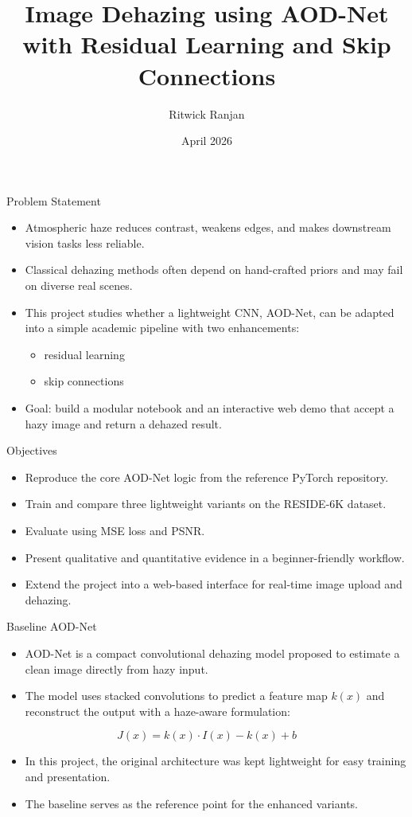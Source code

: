 \documentclass[aspectratio=169]{beamer}
\title[Image Dehazing with AOD-Net]{Image Dehazing using AOD-Net\\with Residual Learning and Skip Connections}
\author{Ritwick Ranjan}
\institute{Department of Computer Science \\ Your Institute Name}
\date{April 2026}
\begin{document}
\begin{frame}
  \titlepage
\end{frame}

\begin{frame}{Problem Statement}
  \begin{itemize}
    \item Atmospheric haze reduces contrast, weakens edges, and makes downstream vision tasks less reliable.
    \item Classical dehazing methods often depend on hand-crafted priors and may fail on diverse real scenes.
    \item This project studies whether a lightweight CNN, AOD-Net, can be adapted into a simple academic pipeline with two enhancements:
    \begin{itemize}
      \item residual learning
      \item skip connections
    \end{itemize}
    \item Goal: build a modular notebook and an interactive web demo that accept a hazy image and return a dehazed result.
  \end{itemize}
\end{frame}

\begin{frame}{Objectives}
  \begin{itemize}
    \item Reproduce the core AOD-Net logic from the reference PyTorch repository.
    \item Train and compare three lightweight variants on the RESIDE-6K dataset.
    \item Evaluate using MSE loss and PSNR.
    \item Present qualitative and quantitative evidence in a beginner-friendly workflow.
    \item Extend the project into a web-based interface for real-time image upload and dehazing.
  \end{itemize}
\end{frame}

\begin{frame}{Baseline AOD-Net}
  \begin{itemize}
    \item AOD-Net is a compact convolutional dehazing model proposed to estimate a clean image directly from hazy input.
    \item The model uses stacked convolutions to predict a feature map \(k(x)\) and reconstruct the output with a haze-aware formulation:
  \end{itemize}
  \[
    J(x) = k(x)\cdot I(x) - k(x) + b
  \]
  \begin{itemize}
    \item In this project, the original architecture was kept lightweight for easy training and presentation.
    \item The baseline serves as the reference point for the enhanced variants.
  \end{itemize}
\end{frame}
\end{document}
